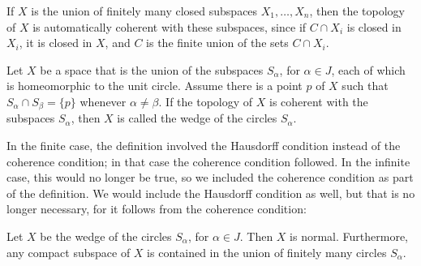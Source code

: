 If \(X\) is the union of finitely many closed subspaces \(X_{1},\ldots ,X_{n}\), then the topology of \(X\) is automatically coherent with these subspaces, since if \(C \cap {X}_{i}\) is closed in \(X_{i}\), it is closed in \(X\), and \(C\) is the finite union of the sets \(C \cap {X}_{i}\).

\begin{definition}
Let \(X\) be a space that is the union of the subspaces \(S_{\alpha }\), for \(\alpha \in J\), each of which is homeomorphic to the unit circle. Assume there is a point \(p\) of \(X\) such that \(S_{\alpha } \cap {S}_{\beta } = \{ p\}\) whenever \(\alpha \neq \beta\). If the topology of \(X\) is coherent with the subspaces \(S_{\alpha }\), then \(X\) is called the wedge of the circles \(S_{\alpha }\).
\end{definition}

In the finite case, the definition involved the Hausdorff condition instead of the coherence condition; in that case the coherence condition followed. In the infinite case, this would no longer be true, so we included the coherence condition as part of the definition. We would include the Hausdorff condition as well, but that is no longer necessary, for it follows from the coherence condition:

\begin{lemma}
\label{lem:\thetheorem}
Let \(X\) be the wedge of the circles \(S_{\alpha }\), for \(\alpha \in J\). Then \(X\) is normal. Furthermore, any compact subspace of \(X\) is contained in the union of finitely many circles \(S_{\alpha }\).
\end{lemma}

